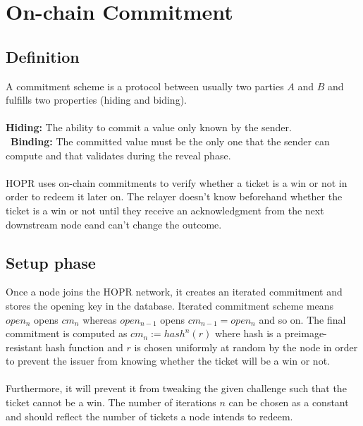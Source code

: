 \section{On-chain Commitment}

\subsection*{Definition}
A commitment scheme is a protocol between usually two parties $A$ and $B$ and fulfills two properties (hiding and biding).
\\~\\\textbf{Hiding:} The ability to commit a value only known by the sender.
\\~\textbf{Binding:} The committed value must be the only one that the sender can compute and that validates during the reveal phase. 
\\~\\HOPR uses on-chain commitments to verify whether a ticket is a win or not in order to redeem it later on. The relayer doesn't know beforehand whether the ticket is a win or not until they receive an acknowledgment from the next downstream node eand can't change the outcome.
\subsection{Setup phase}
Once a node joins the HOPR network, it creates an iterated commitment and stores the opening key in the database. 
Iterated commitment scheme means $open_n$ opens $cm_n$ whereas $open_{n-1}$ opens $cm_{n-1}=open_n$ and so on. 
\newline The final commitment is computed as $cm_n:= hash^n(r)$ where hash is a preimage-resistant hash function and 
$r$ is chosen uniformly at random by the node in order to prevent the issuer from knowing whether the ticket will be a win or not. 
\\~\\ Furthermore, it will prevent it from tweaking the given challenge such that the ticket cannot be a win.
The number of iterations $n$ can be chosen as a constant and should reflect the number of tickets a node intends to redeem.

